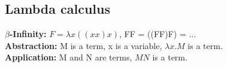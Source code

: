 \begin{comment}
	For example is a parse tree a representation of the structure of the text, but it is not saying a lot about the meaning of the text.\\
	Semantics are needed when we want to actually do something with language.
	Recognising speech is done by determining the words that were said, but wanting to derive the meaning needs parsing the words into commands, e.g. understand the instructions.\\
	\textbf{Logical form:} Representation of meaning of a sentence, formed out of quantifiers, variables, boolean expressions and predicates. 
	Each expression maps to a single meaning.\\
	\textbf{Principle of compositionality:} We try to build models over the constituents of a sentence, instead of doing it for each sentence of the human language.\\
	If we have a parse tree with heads, we can compose the semantics over the constituents.
	The meaning of $x \rightarrow yz$ is a function of $y.sem$ and $z.sem$\\
\end{comment} 

\subsection{Lambda calculus}
\textbf{$\beta$-Infinity:} $F = \lambda x((xx)x)$, FF = ((FF)F) = ...\\
\textbf{Abstraction:} M is a term, x is a variable, $\lambda x. M$ is a term.\\
\textbf{Application:} M and N are terms, $MN$ is a term.\\
\begin{comment}
	\textbf{$\alpha$-renaming} switches out variable names, such that in a reduction the variables don't change their free/bound occupation.\\
	\textbf{$\beta$-reduction} applies an argument to a lambda term, f.e. $\lambda x. M N = M[x:=N]$.\\
	$\beta$-reductions can be infinite: $F = \lambda x((xx)x)$, FF = ((FF)F) = ...\\
	\textbf{Equivalence:} If one term can be obtained from the other in a finite amount of alpha and beta conversions. This problem is undecidable.\\
	\textbf{Logical constants:} Objects and relations (with arity) between real Objects.\\
\end{comment} 

